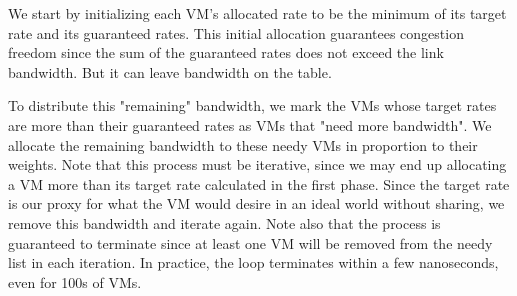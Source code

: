 We start by initializing each VM's allocated rate to be the minimum of its
target rate and its guaranteed rates.  This initial allocation guarantees
congestion freedom since the sum of the guaranteed rates does not exceed the
link bandwidth.  But it can leave bandwidth on the table.

To distribute this "remaining" bandwidth, we mark the VMs whose target rates are
more than their guaranteed rates as VMs that "need more bandwidth".  We allocate
the remaining bandwidth to these needy VMs in proportion to their weights.  Note
that this process must be iterative, since we may end up allocating a VM more
than its target rate calculated in the first phase.  Since the target rate is
our proxy for what the VM would desire in an ideal world without sharing, we
remove this bandwidth and iterate again.  Note also that the process is
guaranteed to terminate since at least one VM will be removed from the needy
list in each iteration. In practice, the loop terminates within a few
nanoseconds, even for 100s of VMs.

